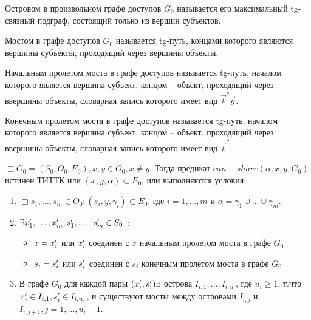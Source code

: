 \begin{defs}[Остров]
	Островом в произвольном графе доступов $G_0$ называется его максимальный tg-связный подграф, состоящий только из вершин субъектов.
\end{defs}

\begin{defs}[Мост]
	Мостом в графе доступов $G_0$ называется tg-путь, концами которого являются вершины субъекты, проходящий через вершины объекты.
\end{defs}

\begin{defs}
	Начальным пролетом моста в графе доступов называется tg-путь, началом которого является вершина субъект, концом -- объект, проходящий через ввершины объекты, словарная запись которого имеет вид
	 $ \overrightarrow{t}^* \overrightarrow{g} $.
\end{defs}

\begin{defs}
	Конечным пролетом моста в графе доступов называется tg-путь, началом которого является вершина субъект, концом -- объект, проходящий через ввершины объекты, словарная запись которого имеет вид
	$\overrightarrow{t}^*$.
\end{defs}

\begin{proofs}
	$\sqsupset  G_0 = (S_0, O_0, E_0), x,y \in O_0, x \neq y$. Тогда предикат $can-share(\alpha, x, y, G_0)$
	истинен ТИТТК или $(x, y, \alpha ) \subset E_0$, или выполняются условия:
	\begin{enumerate}
		\item $ \sqsupset s_1, \ldots, s_m \in O_0 : (s_i, y, \gamma_i) \subset E_0 $, где
		$ i = 1, \ldots, m $ и $ \alpha = \gamma_1 \cup \ldots \cup \gamma_m $.
		\item $ \exists x_1^{\prime}, \ldots, x_m^{\prime}, s_1^{\prime}, \ldots, s_m^{\prime} \in S_0$ :
			\begin{itemize}
				\item $x = x_i^{\prime}$ или $x_i^{\prime}$ соединен с $x$ начальным пролетом моста в графе $G_0$
				\item $s_i = s_i^{\prime}$ или $s_i^{\prime}$ соединен с $s_i$ конечным пролетом моста в графе $G_0$
			\end{itemize}
		\item В графе $G_0$ для каждой пары $(x_i^{\prime}, s_i^{\prime}) \exists $ острова $I_{i,1}, \ldots, I_{i, u_{i}}$, где $u_i \geqslant 1$, т.что
		$x_i^{\prime} \in I_{i,1}, s_i^{\prime} \in I_{i, u_{i}}$, и существуют мосты между островами $I_{i,j}$ и $I_{i, j+1}, j = 1, \ldots, u_i - 1$.
	\end{enumerate}
\end{proofs}

